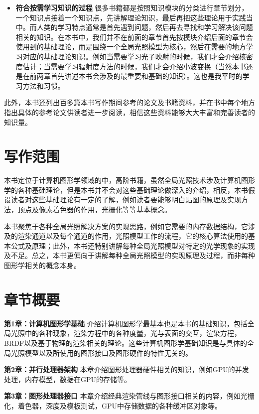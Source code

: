 \begin{itemize}
	\item \textbf{符合按需学习知识的过程 } 很多书籍都是按照知识模块的分类进行章节划分，一个知识点接着一个知识点，先讲解理论知识，最后再把这些理论用于实践当中。而人类的学习特点通常是首先遇到问题，然后再去寻找和学习解决该问题相关的知识。在本书中，我们并不在前面的章节首先按模块介绍后面的章节会使用到的基础理论，而是围绕一个全局光照模型为核心，然后在需要的地方学习对应的基础理论知识。例如当需要学习光子映射的时候，我们才会介绍核密度估计；当需要学习辐射度方法的时候，我们才会介绍小波变换（当然本书还是在前两章首先讲述本书会涉及的最重要和基础的知识）。这也是我平时的学习方法和习惯。
\end{itemize}

此外，本书还列出百多篇本书写作期间参考的论文及书籍资料，并在书中每个地方指出具体的参考论文供读者进一步阅读，相信这些资料能够大大丰富和完善读者的知识量。



\section*{写作范围}
本书定位于计算机图形学领域的中，高阶书籍，虽然全局光照技术涉及计算机图形学的各种基础理论，但是本书并不会对这些基础理论做深入的介绍，相反，本书假设读者对这些基础理论有一定的了解，例如读者要能够明白贴图的原理及实现方法，顶点及像素着色器的作用，光栅化等等基本概念。

本书聚焦于各种全局光照解决方案的实现思路，例如它需要的内存数据结构，它涉及的渲染通道以及每个通道的作用，光照模型工作的流程，它的核心算法使用的基本公式及原理；此外，本书还特别讲解每种全局光照模型对特定的光学现象的实现及不足。总之，本书更偏向于讲解每种全局光照模型的实现原理及过程，而非每种图形学相关的概念本身。




\section*{章节概要}
\textbf{第1章：计算机图形学基础 } 介绍计算机图形学最基本也是本书的基础知识，包括全局光照中的各种现象，渲染方程中的各种度量，光与表面的交互，渲染方程，BRDF以及基于物理的渲染相关的理论。这些计算机图形学基础知识是与具体的全局光照模型以及所使用的图形接口及图形硬件的特性无关的。

\textbf{第2章：并行处理器架构 } 本章介绍图形处理器硬件相关的知识，例如GPU的并发处理，内存模型，数据在GPU的存储等。

\textbf{第3章：图形处理器接口 } 本章介绍经典渲染管线与图形接口相关的内容，例如光栅化，着色器，深度及模板测试，GPU中存储数据的各种缓冲区对象等。

